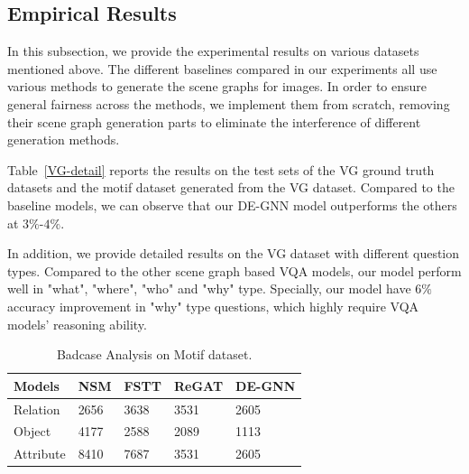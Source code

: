 \documentclass[letterpaper]{article} %
\begin{document}
\subsection{Empirical Results}
In this subsection, we provide the experimental results on various datasets mentioned above. 
The different baselines compared in our experiments all use various methods to generate the scene graphs for images. 
In order to ensure general fairness across the methods, we implement them from scratch, removing their scene graph generation parts to eliminate the interference of different generation methods.

Table~\ref{VG-detail} reports the results on the test sets of the VG ground truth datasets and the motif dataset generated from the VG dataset. Compared to the baseline models, we can observe that our DE-GNN model outperforms the others at $3\%$-$4\%$. 

In addition, we provide detailed results on the VG dataset with different question types. Compared to the other scene graph based VQA models, our model perform well in "what", "where", "who" and "why" type. Specially, our model have $6\%$ accuracy improvement in "why" type questions, which highly require VQA models' reasoning ability.


\begin{table}
    \begin{tabular}{lllll}
    \hline
     \textbf{Models}& NSM & FSTT & ReGAT & DE-GNN\\
    \hline
     Relation & 2656 & 3638 & 3531 & 2605\\
     Object & 4177 &2588 & 2089 & 1113\\
     Attribute & 8410 & 7687 & 3531 & 2605\\
    \hline
    \end{tabular}
\caption{\label{badcase}
Badcase Analysis on Motif dataset. 
}
\end{table} 
\end{document}
